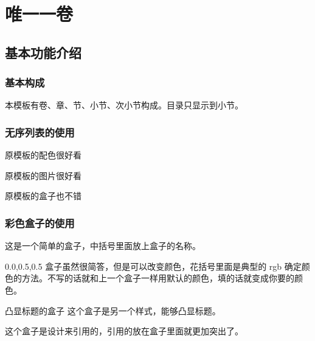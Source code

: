 \documentclass[bibstyle=super,font=empty]{Muse-Book}
\begin{document}
\frontmatter
{}
 
\tableofcontents

\mainmatter

\part{唯一一卷}
\chapter{基本功能介绍}
\section{基本构成}

本模板有卷、章、节、小节、次小节构成。目录只显示到小节。

\section{无序列表的使用}

\begin{rpg-list}
	\item 原模板的配色很好看
	\item 原模板的图片很好看
	\item 原模板的盒子也不错
\end{rpg-list}

\section{彩色盒子的使用}

\begin{muse-obox}[简单的彩色盒子]
	这是一个简单的盒子，中括号里面放上盒子的名称。
\end{muse-obox}


\begin{muse-obox}[颜色可以改变的]{0.0,0.5,0.5}
	盒子虽然很简答，但是可以改变颜色，花括号里面是典型的 rgb 确定颜色的方法。不写的话就和上一个盒子一样用默认的颜色，填的话就变成你要的颜色。
\end{muse-obox}
	
\begin{muse-titlebox}{凸显标题的盒子}
		这个盒子是另一个样式，能够凸显标题。
\end{muse-titlebox}

\begin{muse-quotebox}
	这个盒子是设计来引用的，引用的放在盒子里面就更加突出了。
\end{muse-quotebox}
	
\end{document}
